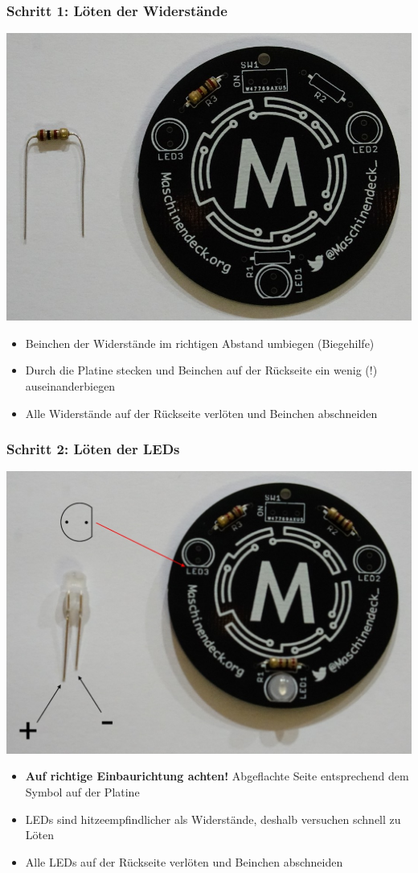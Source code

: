 \documentclass[10pt]{beamer}
\begin{document}

	\begin{frame}
		\frametitle{Schritt 1: Löten der Widerstände}
		\centering \includegraphics[width=.6\linewidth]{images/step1.png}
		\begin{itemize}
			\item Beinchen der Widerstände im richtigen Abstand umbiegen (Biegehilfe)
			\item Durch die Platine stecken und Beinchen auf der Rückseite ein wenig (!) auseinanderbiegen 
			\item Alle Widerstände auf der Rückseite verlöten und Beinchen abschneiden			
		\end{itemize}		
	\end{frame}
	
	\begin{frame}
		\frametitle{Schritt 2: Löten der LEDs}
		\centering \includegraphics[width=.6\linewidth]{images/step2.png}
		\begin{itemize}
			\item \textbf{Auf richtige Einbaurichtung achten!} Abgeflachte Seite entsprechend dem Symbol auf der Platine
			\item LEDs sind hitzeempfindlicher als Widerstände, deshalb versuchen schnell zu Löten
			\item Alle LEDs auf der Rückseite verlöten und Beinchen abschneiden			
		\end{itemize}
	\end{frame}
\end{document}
